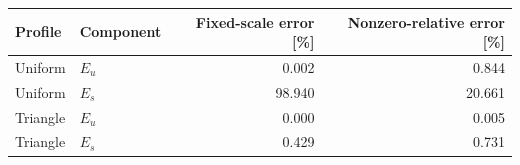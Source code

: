 \begin{tabular}{llrr}
\toprule
Profile & Component & Fixed-scale error [\%] & Nonzero-relative error [\%] \\
\midrule
Uniform & $E_u$ & 0.002 & 0.844 \\
Uniform & $E_s$ & 98.940 & 20.661 \\
Triangle & $E_u$ & 0.000 & 0.005 \\
Triangle & $E_s$ & 0.429 & 0.731 \\
\bottomrule
\end{tabular}
